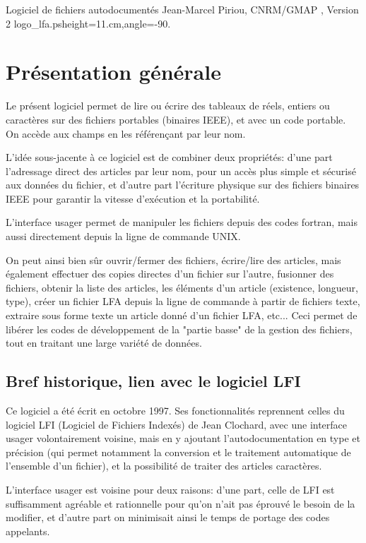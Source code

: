 \documentclass[10pt,french]{book}
\begin{document}
 {Logiciel de fichiers autodocumentés} {Jean-Marcel Piriou, CNRM/GMAP} 
{\aujour, Version 2} 
{logo_lfa.ps}{height=11.cm,angle=-90.}

\chapter{Présentation générale}

\p  Le présent logiciel permet de lire ou écrire des tableaux de réels,
entiers ou caractères sur des fichiers portables (binaires IEEE), et avec un
code portable. On accède aux champs en les référençant par leur nom.

\p L'idée sous-jacente à ce logiciel est de combiner deux propriétés:
d'une part l'adressage direct des articles par leur nom, pour
un accès plus simple et sécurisé 
aux données du fichier,
et d'autre part l'écriture physique sur des fichiers binaires IEEE
pour garantir la vitesse d'exécution et la portabilité.

\p  L'interface  usager  permet de manipuler
les fichiers depuis des codes fortran,
mais aussi directement depuis la ligne de commande UNIX.


\p On peut ainsi bien sûr
ouvrir/fermer des
fichiers,  écrire/lire des articles,  mais  également  effectuer
des  copies
directes d'un fichier sur l'autre, fusionner
des fichiers, obtenir la liste des
articles, les éléments d'un article (existence, longueur,
type), créer un fichier
LFA depuis la ligne de commande à partir de fichiers texte,
extraire sous forme texte un article donné d'un fichier LFA, 
etc...  
Ceci  permet de libérer les codes de développement de la
"partie basse" de la gestion des fichiers, tout en traitant
une large variété de données.

\section*{Bref historique, lien avec le logiciel LFI}

\p  Ce  logiciel  a  été écrit en octobre 1997. 
Ses fonctionnalités reprennent
celles  du logiciel LFI (Logiciel de Fichiers Indexés) de Jean Clochard,
avec  une interface usager volontairement voisine, mais en y ajoutant 
l'autodocumentation en type et précision (qui permet
notamment la conversion et le traitement automatique
de l'ensemble d'un fichier), et la possibilité de traiter
des articles caractères.

\p  L'interface  usager est voisine pour deux raisons: d'une part, celle
de  LFI  est  suffisamment  agréable et rationnelle pour qu'on n'ait pas
éprouvé le besoin de la modifier, et d'autre part on minimisait ainsi le
temps de portage des codes appelants.
\end{document}
